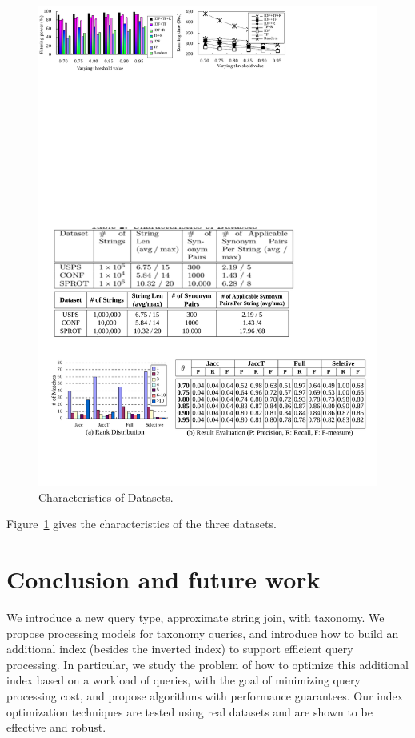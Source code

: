 \documentclass{sig-alternate}
\begin{document}
\begin{figure}
  \small
  \centering
  \includegraphics[width=\linewidth]{figures/Characteristics_Datasets}
   \vspace{-6mm}
  \caption{Characteristics of Datasets.}
  \label{tab:data_characteristics}
\end{figure}


Figure~\ref{tab:data_characteristics} gives the characteristics of the
three datasets.




\section{Conclusion and future work}

We introduce a new query type, approximate string join, with taxonomy. We propose processing
models for taxonomy queries, and introduce how to build
an additional index (besides the inverted index) to support
efficient query processing. In particular, we study the problem
of how to optimize this additional index based on a
workload of queries, with the goal of minimizing query processing
cost, and propose algorithms with performance guarantees.
Our index optimization techniques are tested using
real datasets and are shown to be effective and robust.





\end{document}
